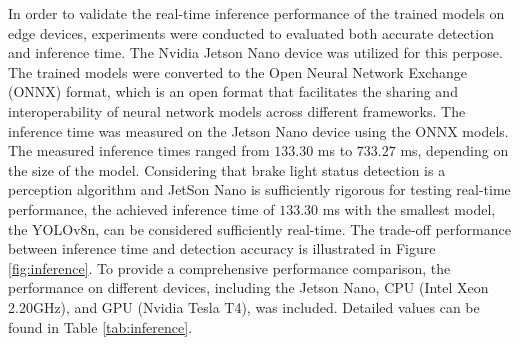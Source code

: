 In order to validate the real-time inference performance of the trained models on edge devices, experiments were conducted to evaluated both accurate detection and inference time. 
The Nvidia Jetson Nano device was utilized for this perpose.
The trained models were converted to the Open Neural Network Exchange (ONNX) format, which is an open format that facilitates the sharing and interoperability of neural network models across different frameworks. The inference time was measured on the Jetson Nano device using the ONNX models.
The measured inference times ranged from $133.30$ ms to $733.27$ ms, depending on the size of the model.
Considering that brake light status detection is a perception algorithm and JetSon Nano is sufficiently rigorous for testing real-time performance, the achieved inference time of $133.30$ ms with the smallest model, the YOLOv8n, can be considered sufficiently real-time.
The trade-off performance between inference time and detection accuracy is illustrated in Figure \ref{fig:inference}.
To provide a comprehensive performance comparison, the performance on different devices, including the Jetson Nano, CPU (Intel Xeon 2.20GHz), and GPU (Nvidia Tesla T4), was included.
Detailed values can be found in Table \ref{tab:inference}.



